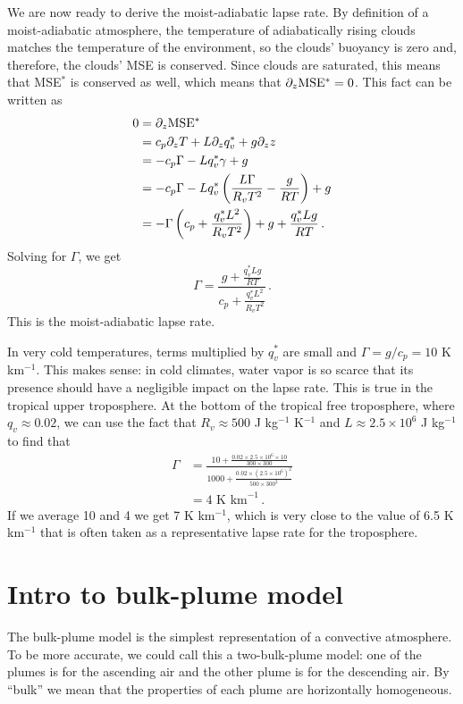 \documentclass[12pt]{article}
\newcommand{\mse}{{\text{MSE}}}
\begin{document}
We are now ready to derive the moist-adiabatic lapse rate.  By definition of a moist-adiabatic atmosphere, the temperature of adiabatically rising clouds matches the temperature of the environment, so the clouds' buoyancy is zero and, therefore, the clouds' MSE is conserved.  Since clouds are saturated, this means that MSE$^*$ is conserved as well, which means that $\ppz \mse{}^* = 0$.  This fact can be written as
\begin{align*}
0 &= \ppz \mse{}^* \\
&= c_p \ppz T + L \ppz q_v^* + g \ppz z \\
&= -c_p \Gamma - L q_v^* \gamma + g \\
&= -c_p \Gamma - L q_v^* \left( \frac{L\Gamma}{R_v T^2} - \frac{g}{RT} \right) + g \\
&= -\Gamma \left( c_p + \frac{q_v^* L^2}{R_v T^2} \right) + g + \frac{q_v^* L g}{RT} \, .
\end{align*}
Solving for $\Gamma$, we get
\begin{equation}
\Gamma = \frac{\displaystyle g + \frac{q_v^*Lg}{RT}}{\displaystyle c_p + \frac{q_v^*L^2}{R_v T^2}} \, . \label{moist_adiabatic_lapse}
\end{equation}
This is the moist-adiabatic lapse rate.


In very cold temperatures, terms multiplied by $q_v^*$ are small and $\Gamma = g/c_p = 10$ K km$^{-1}$.  This makes sense: in cold climates, water vapor is so scarce that its presence should have a negligible impact on the lapse rate.  This is true in the tropical upper troposphere.  At the bottom of the tropical free troposphere, where $q_v \approx 0.02$, we can use the fact that $R_v \approx 500$ J kg$^{-1}$ K$^{-1}$ and $L \approx 2.5 \times 10^6$ J kg$^{-1}$ to find that 
\begin{align}
\Gamma &= \frac{10 + \frac{0.02 \times 2.5 \times 10^6 \times 10}{300 \times 300}}{1000 + \frac{0.02 \times (2.5 \times 10^6)^2}{500 \times 300^2}} \\
&= 4 \text{ K km}^{-1} \, .
\end{align}
If we average 10 and 4 we get 7 K km$^{-1}$, which is very close to the value of 6.5 K km$^{-1}$ that is often taken as a representative lapse rate for the troposphere.


\section{Intro to bulk-plume model}


The bulk-plume model is the simplest representation of a convective atmosphere.  To be more accurate, we could call this a two-bulk-plume model: one of the plumes is for the ascending air and the other plume is for the descending air.  By ``bulk'' we mean that the properties of each plume are horizontally homogeneous.
\end{document}
